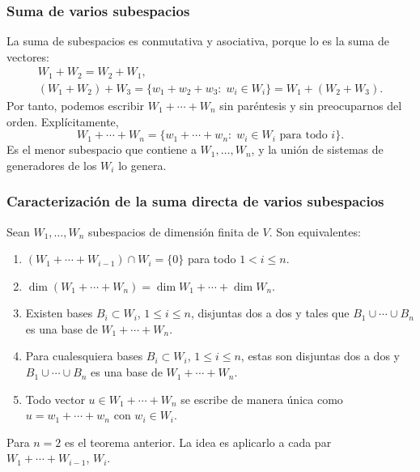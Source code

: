 \begin{frame}
    \frametitle{Suma de varios subespacios}

    La suma de subespacios es \alert{conmutativa} y \alert{asociativa},
    porque lo es la suma de vectores:
    \begin{gather*}
        W_1+W_2=W_2+W_1,\\
        (W_1+W_2)+W_3=\{w_1+w_2+w_3:\; w_i\in W_i\}=W_1+(W_2+W_3).
    \end{gather*}
    Por tanto, podemos escribir $W_1+\cdots+W_n$ sin paréntesis y sin
    preocuparnos del orden. Explícitamente,
    \[
        W_1+\cdots+W_n=\{w_1+\cdots+w_n:\; w_i\in W_i\text{ para todo }i\}.
    \]
    Es el menor subespacio que contiene a $W_1,\ldots,W_n$, y la unión de
    sistemas de generadores de los $W_i$ lo genera.
\end{frame}



\begin{frame}
    \frametitle{Caracterización de la suma directa de varios subespacios}

    \begin{theorem}
        Sean $W_1,\ldots,W_n$ subespacios de dimensión finita de $V$. Son
        equivalentes:
        \begin{enumerate}[(1)]
            \item $(W_1+\cdots+W_{i-1})\cap W_i=\{0\}$ para todo
            $1<i\leq n$.
            \item $\dim(W_1+\cdots+W_n)=\dim W_1+\cdots+\dim W_n$.
            \item Existen bases $B_i\subset W_i$, $1\leq i\leq n$, disjuntas
            dos a dos y tales que $B_1\cup\cdots\cup B_n$ es una base de
            $W_1+\cdots+W_n$.
            \item Para cualesquiera bases $B_i\subset W_i$, $1\leq i\leq n$,
            estas son disjuntas dos a dos y $B_1\cup\cdots\cup B_n$ es una
            base de $W_1+\cdots+W_n$.
            \item Todo vector $u\in W_1+\cdots+W_n$ se escribe de manera
            \alert{única} como $u=w_1+\cdots+w_n$ con $w_i\in W_i$.
        \end{enumerate}
    \end{theorem}

    Para $n=2$ es el teorema anterior. La idea es aplicarlo a cada par
    $W_1+\cdots+W_{i-1}$, $W_i$.
\end{frame}


